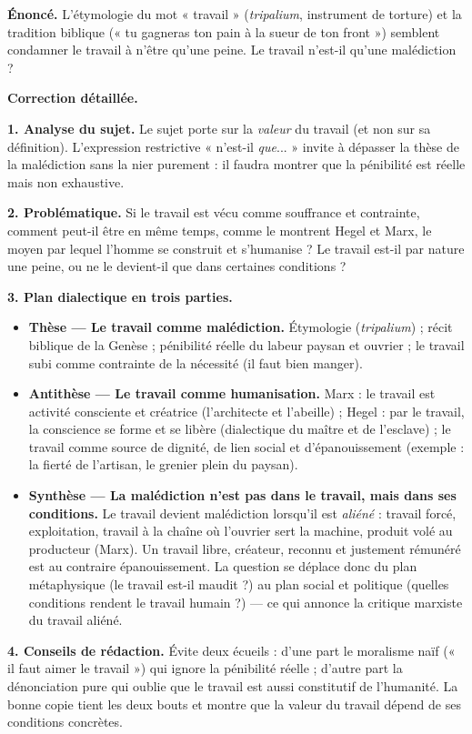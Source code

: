 \documentclass[11pt]{article}
\begin{document}
\begin{exoresolu}
\textbf{Énoncé.} L'étymologie du mot « travail » (\emph{tripalium}, instrument de torture) et la tradition biblique (« tu gagneras ton pain à la sueur de ton front ») semblent condamner le travail à n'être qu'une peine. Le travail n'est-il qu'une malédiction ?

\tcblower
\textbf{Correction détaillée.}

\textbf{1. Analyse du sujet.} Le sujet porte sur la \emph{valeur} du travail (et non sur sa définition). L'expression restrictive « n'est-il \emph{que}... » invite à dépasser la thèse de la malédiction sans la nier purement : il faudra montrer que la pénibilité est réelle mais non exhaustive.

\textbf{2. Problématique.} Si le travail est vécu comme souffrance et contrainte, comment peut-il être en même temps, comme le montrent Hegel et Marx, le moyen par lequel l'homme se construit et s'humanise ? Le travail est-il par nature une peine, ou ne le devient-il que dans certaines conditions ?

\textbf{3. Plan dialectique en trois parties.}
\begin{itemize}
\item \textbf{Thèse — Le travail comme malédiction.} Étymologie (\emph{tripalium}) ; récit biblique de la Genèse ; pénibilité réelle du labeur paysan et ouvrier ; le travail subi comme contrainte de la nécessité (il faut bien manger).
\item \textbf{Antithèse — Le travail comme humanisation.} Marx : le travail est activité consciente et créatrice (l'architecte et l'abeille) ; Hegel : par le travail, la conscience se forme et se libère (dialectique du maître et de l'esclave) ; le travail comme source de dignité, de lien social et d'épanouissement (exemple : la fierté de l'artisan, le grenier plein du paysan).
\item \textbf{Synthèse — La malédiction n'est pas dans le travail, mais dans ses conditions.} Le travail devient malédiction lorsqu'il est \emph{aliéné} : travail forcé, exploitation, travail à la chaîne où l'ouvrier sert la machine, produit volé au producteur (Marx). Un travail libre, créateur, reconnu et justement rémunéré est au contraire épanouissement. La question se déplace donc du plan métaphysique (le travail est-il maudit ?) au plan social et politique (quelles conditions rendent le travail humain ?) — ce qui annonce la critique marxiste du travail aliéné.
\end{itemize}

\textbf{4. Conseils de rédaction.} Évite deux écueils : d'une part le moralisme naïf (« il faut aimer le travail ») qui ignore la pénibilité réelle ; d'autre part la dénonciation pure qui oublie que le travail est aussi constitutif de l'humanité. La bonne copie tient les deux bouts et montre que la valeur du travail dépend de ses conditions concrètes.
\end{exoresolu}
\end{document}
